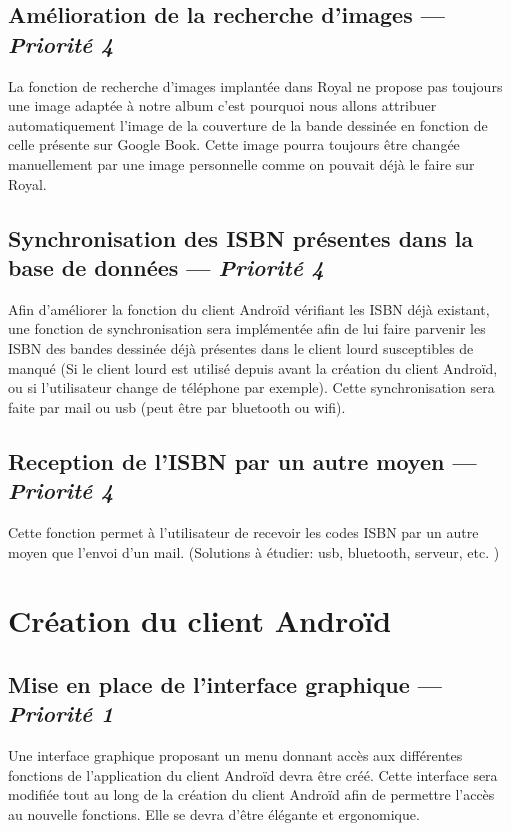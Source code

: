 \section[Amélioration de la recherche d'images]{Amélioration de la recherche d'images — \emph{Priorité 4}}
La fonction de recherche d'images implantée dans Royal ne propose pas toujours une image adaptée à notre album c'est pourquoi nous allons attribuer automatiquement l'image de la couverture de la bande dessinée en fonction de celle présente sur Google Book. 
Cette image pourra toujours être changée manuellement par une image personnelle comme on pouvait déjà le faire sur Royal.

\section[Synchronisation des ISBN présentes dans la base de données]{Synchronisation des ISBN présentes dans la base de données — \emph{Priorité 4}}
Afin d'améliorer la fonction du client Androïd vérifiant les ISBN déjà existant, une fonction de synchronisation sera implémentée afin de lui faire parvenir les ISBN des bandes dessinée déjà présentes dans le client lourd susceptibles de manqué (Si le client lourd est utilisé depuis avant la création du client Androïd, ou si l'utilisateur change de téléphone par exemple). 
Cette synchronisation sera faite par mail ou usb (peut être par bluetooth ou wifi).

\section[Reception de l'ISBN par un autre moyen]{Reception de l'ISBN par un autre moyen — \emph{Priorité 4}}
Cette fonction permet à l'utilisateur de recevoir les codes ISBN par un autre moyen que l'envoi d'un mail. 
(Solutions à étudier: usb, bluetooth, serveur, etc. )



\chapter{Création du client Androïd}


\section[Mise en place de l'interface graphique]{Mise en place de l'interface graphique  — \emph{Priorité 1}}
Une interface graphique proposant un menu donnant accès aux différentes fonctions de l'application du client Androïd devra être créé. 
Cette interface sera modifiée tout au long de la création du client Androïd afin de permettre l'accès au nouvelle fonctions.
Elle se devra d'être élégante et ergonomique.

